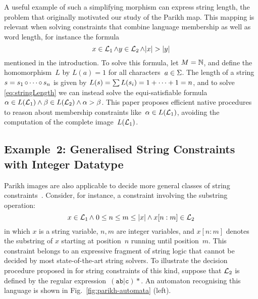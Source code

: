 \documentclass[acmsmall,review,anonymous,screen]{acmart}\settopmatter{printfolios=true,printccs=false,printacmref=true}
\theoremstyle{definition}
\begin{document}
A useful example of such a simplifying morphism can express string
length, the problem that originally motivated our study of the Parikh
map. This mapping is relevant when solving constraints that combine
language membership as well as word length, for instance the formula
\begin{equation}\label{eq:stringLength}
x \in \operatorname{\mathcal{L}}_1 \wedge y \in \operatorname{\mathcal{L}}_2 \wedge |x| > |y|
\end{equation}
mentioned in the introduction. To solve this formula, let
$M = \mathbb{N}$, and define the homomorphism~$L$ by $L(a) = 1$
for all characters~$a \in \Sigma$. The length of a string
$s = s_1 \operatorname{\circ} \cdots \operatorname{\circ} s_n$ is given by
$L(s) = \sum L(s_i) = 1 + \cdots + 1 = n$, and to solve
\eqref{eq:stringLength} we can instead solve the equi-satisfiable
formula~$\alpha \in L(\operatorname{\mathcal{L}}_1) \wedge \beta \in L(\operatorname{\mathcal{L}}_2)
\wedge \alpha > \beta$. This paper proposes efficient native
procedures to reason about membership constraints
like~$\alpha \in L(\operatorname{\mathcal{L}}_1)$, avoiding the computation of
the complete image~$L(\operatorname{\mathcal{L}}_1)$.

\subsection{Example~2: Generalised String Constraints with Integer
  Datatype}\label{sec:parikh-automata}

Parikh images are also applicable to decide more general classes of
string constraints~\cite{ostrich-plus}. Consider, for instance, a
constraint involving the substring operation:
\begin{equation}
  \label{eq:substring}
  x \in \operatorname{\mathcal{L}}_1 \wedge \; 0 \leq n \leq m \leq |x| \wedge x[n:m] \in \operatorname{\mathcal{L}}_2
\end{equation}
in which $x$ is a string variable, $n, m$ are integer variables, and
$x[n:m]$ denotes the substring of $x$ starting at position~$n$ running
until position~$m$. This constraint belongs to an expressive fragment
of string logic that cannot be decided by most state-of-the-art string
solvers. To illustrate the decision procedure proposed in
\cite{ostrich-plus} for string constraints of this kind, suppose that
$\operatorname{\mathcal{L}}_2$ is defined by the regular
expression~$\mathtt{(ab|c)*}$. An automaton recognising this language
is shown in Fig.~\ref{fig:parikh-automata} (left).
\end{document}
